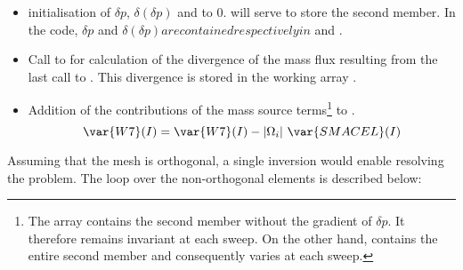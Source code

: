 \begin{itemize}
\item initialisation of $\delta p$, $\delta(\delta p)$ and  to 0.  will serve to store the second member. In the code, $\delta p$ and $\delta(\delta p) are contained respectively in $ and .
\item Call to  for calculation of the divergence of the mass flux resulting from the last call to . This divergence is stored in the working array .
\item Addition of the contributions of the mass source terms\footnote{The array  contains the second member without the gradient of $\delta p$. It therefore remains invariant at each sweep. On the other hand,  contains the entire second member and consequently varies at each sweep.} to .
\begin{equation}
\var{W7}(I) =  \var{W7}(I) - |\Omega_i|\ \var{SMACEL}(I)
\label {SM2}
\end{equation}
\end{itemize}

Assuming that the mesh is orthogonal, a single inversion would enable resolving the problem. The loop over the non-orthogonal elements is described below:


